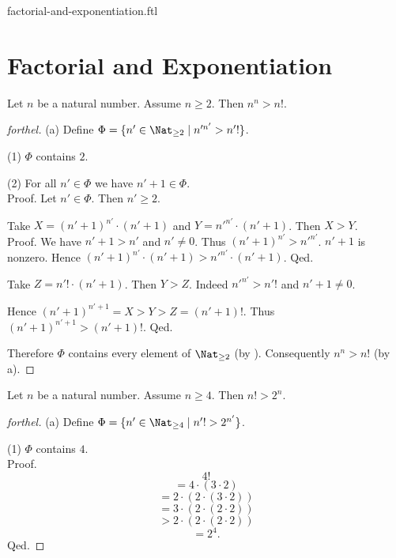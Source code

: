 \documentclass{naproche-library}
\begin{document}
\begin{smodule}{factorial-and-exponentiation.ftl}

  \section*{Factorial and Exponentiation}

  \begin{proposition}[forthel,id=ARITHMETIC_12_8113296594960384,printid]
    Let $n$ be a natural number.
    Assume $n \geq 2$.
    Then $n^{n} > n!$.
  \end{proposition}
  \begin{proof}[forthel]
    (a) Define $\Phi = \{ n' \in \Nat_{\geq 2} \mid n'^{n'} > n'! \}$.

    (1) $\Phi$ contains $2$.

    (2) For all $n' \in \Phi$ we have $n' + 1 \in \Phi$. \\
    Proof.
      Let $n' \in \Phi$.
      Then $n' \geq 2$.

      Take $X = (n' + 1)^{n'} \cdot (n' + 1)$ and $Y = n'^{n'} \cdot (n' + 1)$.
      Then $X > Y$. \\
      Proof.
        We have $n' + 1 > n'$ and $n' \neq 0$.
        Thus $(n' + 1)^{n'} > n'^{n'}$.
        $n' + 1$ is nonzero.
        Hence $(n' + 1)^{n'} \cdot (n' + 1) > n'^{n'} \cdot (n' + 1)$.
      Qed.

      Take $Z = n'! \cdot (n' + 1)$.
      Then $Y > Z$.
      Indeed $n'^{n'} > n'!$ and $n' + 1 \neq 0$.

      Hence $(n' + 1)^{n' + 1} = X > Y > Z = (n' + 1)!$.
      Thus $(n' + 1)^{n' + 1} > (n' + 1)!$.
    Qed.

    Therefore $\Phi$ contains every element of $\Nat_{\geq 2}$ (by ).
    Consequently $n^{n} > n!$ (by a).
  \end{proof}

  \begin{proposition}[forthel,id=ARITHMETIC_12_5413271156817920,printid]
    Let $n$ be a natural number.
    Assume $n \geq 4$.
    Then $n! > 2^{n}$.
  \end{proposition}
  \begin{proof}[forthel]
    (a) Define $\Phi = \{ n' \in \Nat_{\geq 4} \mid n'! > 2^{n'} \}$.

    (1) $\Phi$ contains $4$. \\
    Proof.
      \[  4!                                  \]
      \[    = 4 \cdot (3 \cdot 2)             \]
      \[    = 2 \cdot (2 \cdot (3 \cdot 2))   \]
      \[    = 3 \cdot (2 \cdot (2 \cdot 2))   \]
      \[    > 2 \cdot (2 \cdot (2 \cdot 2))   \]
      \[    = 2^{4}.                          \]
    Qed.


\end{proof}
\end{smodule}
\end{document}
